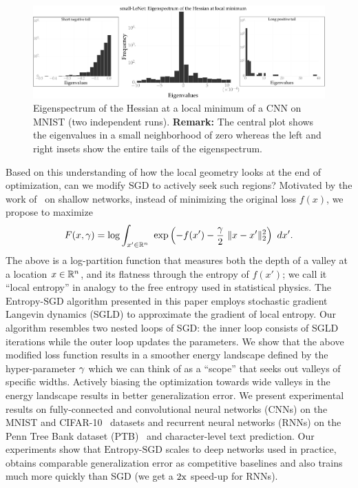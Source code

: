 \documentclass[10pt]{article}
\newcommand{\entropysgd}{\mathrm{Entropy}\textrm{-}\mathrm{SGD}}
\begin{document}
\begin{figure}[tbh]
\centering
\includegraphics[width=\textwidth]{lenet_hessian.pdf}
\caption{\small Eigenspectrum of the Hessian at a local minimum of a CNN on MNIST (two independent runs). \textbf{Remark:} The central plot shows the eigenvalues in a small neighborhood of zero whereas the left and right insets show the entire tails of the eigenspectrum.}
\label{fig:lenet_hessian}
\end{figure}

Based on this understanding of how the local geometry looks at the end of optimization, can we modify SGD to actively seek such regions? Motivated by the work of~\citet{baldassi2015subdominant} on shallow networks, instead of minimizing the original loss $f(x)$, we propose to maximize
$$
F(x, \g) = \log \int_{x' \in \reals^n}\ \exp \rbrac{-f(x') - \f{\g}{2}\ \norm{x-x'}^2_2}\ dx'.
$$
The above is a log-partition function that measures both the depth of a valley at a location  $x \in \mathbb{R}^n$, and its flatness through the entropy of $f(x')$; we call it ``local entropy'' in analogy to the free entropy used in statistical physics. The $\entropysgd$ algorithm presented in this paper employs stochastic gradient Langevin dynamics (SGLD) to approximate the gradient of local entropy. Our algorithm resembles two nested loops of SGD: the inner loop consists of SGLD iterations while the outer loop updates the parameters. We show that the above modified loss function results in a smoother energy landscape defined by the hyper-parameter $\gamma$ which we can think of as a ``scope'' that seeks out valleys of specific widths. Actively biasing the optimization towards wide valleys in the energy landscape results in better generalization error. We present experimental results on fully-connected and convolutional neural networks (CNNs) on the MNIST and CIFAR-10~\citep{krizhevsky2009learning} datasets and recurrent neural networks (RNNs) on the Penn Tree Bank dataset (PTB)~\citep{marcus1993building} and character-level text prediction. Our experiments show that $\entropysgd$ scales to deep networks used in practice, obtains comparable generalization error as competitive baselines and also trains much more quickly than SGD (we get a $2\mathrm{x}$ speed-up for RNNs).
\end{document}
